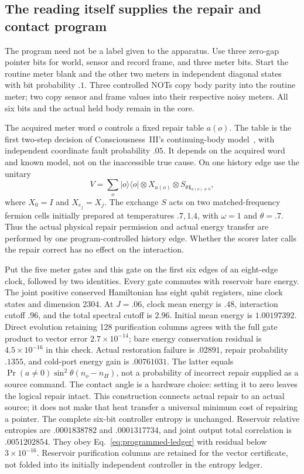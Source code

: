 \subsection{The reading itself supplies the repair and contact program}
\label{sec:joint-diagnostic-core}

The program need not be a label given to the apparatus. Use three
zero-gap pointer bits for world, sensor and record frame, and three
meter bits. Start the routine meter blank and the other two meters
in independent diagonal states with bit probability $.1$.
Three controlled NOTs copy body parity into the routine meter; two
copy sensor and frame values into their respective noisy meters.
All six bits and the actual held body remain in the core.

The acquired meter word $o$ controls a fixed repair table $a(o)$.
The table is the first two-step decision of Consciousness~III's
continuing-body model~\cite{Liu2026CIII}, with independent coordinate
fault probability $.05$. It depends on the acquired word and known
model, not on the inaccessible true cause. On one history edge use
the unitary
\begin{equation}\label{eq:joint-diagnostic-gate}
 V=\sum_o|o\rangle\langle o|\otimes
       X_{a(o)}\otimes S_{\theta\mathbf1_{a(o)\ne0}},
\end{equation}
where $X_0=I$ and $X_{e_j}=X_j$. The exchange $S$ acts on two
matched-frequency fermion cells initially prepared at temperatures
$.7,1.4$, with $\omega=1$ and $\theta=.7$.
Thus the actual physical repair permission and actual energy transfer
are performed by one program-controlled history edge. Whether the
scorer later calls the repair correct has no effect on the interaction.

Put the five meter gates and this gate on the first six edges of an
eight-edge clock, followed by two identities. Every gate commutes
with reservoir bare energy. The joint positive conserved Hamiltonian
has eight qubit registers, nine clock states and dimension 2304.
At $J=.06$, clock mean energy is $.48$, interaction cutoff $.96$,
and the total spectral cutoff is $2.96$. Initial mean energy is
$1.00197392$. Direct evolution retaining 128 purification columns
agrees with the full gate product to vector error
$2.7\times10^{-14}$; bare energy conservation residual is
$4.5\times10^{-16}$ in this check.
Actual restoration failure is $.02891$, repair probability $.1355$,
and cold-port energy gain is $.00761031$. The latter equals
$\Pr(a\ne0)\sin^2\theta(n_o-n_H)$, not a probability of incorrect
repair supplied as a source command.
The contact angle is a hardware choice: setting it to zero leaves
the logical repair intact. This construction connects actual repair
to an actual source; it does not make that heat transfer a universal
minimum cost of repairing a pointer.
The complete six-bit controller entropy is unchanged. Reservoir
relative entropies are $.0001838782$ and $.0001317734$, and joint
output total correlation is $.0051202854$. They obey
Eq.~\eqref{eq:programmed-ledger} with residual below
$3\times10^{-16}$. Reservoir purification columns are retained for
the vector certificate, not folded into its initially independent
controller in the entropy ledger.

